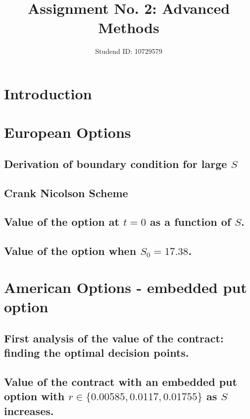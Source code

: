 \documentclass[10pt]{amsart}
\begin{document}
	
	\title{Assignment No. 2: Advanced Methods}
	\author{Studend ID: 10729579}
	\maketitle
	
	\vspace{-0.3cm}
	\setcounter{secnumdepth}{0}
	\section{Introduction}
		
	
	\newpage
	\setcounter{secnumdepth}{4}
	\section{European Options}
		\subsection{Derivation of boundary condition for large $S$}
			
		\subsection{Crank Nicolson Scheme}
			
		\subsection{Value of the option at $t=0$ as a function of $S$.}
			
		\subsection{Value of the option when $S_0=17.38$.}
			
	\vspace{1cm}
	\newpage
	\section{American Options - embedded put option}
			
		\subsection{First analysis of the value of the contract: finding the optimal decision points.}
			
		\subsection{Value of the contract with an embedded put option with $r\in\{0.00585, 0.0117, 0.01755\}$ as $S$ increases.}
			
\end{document}
